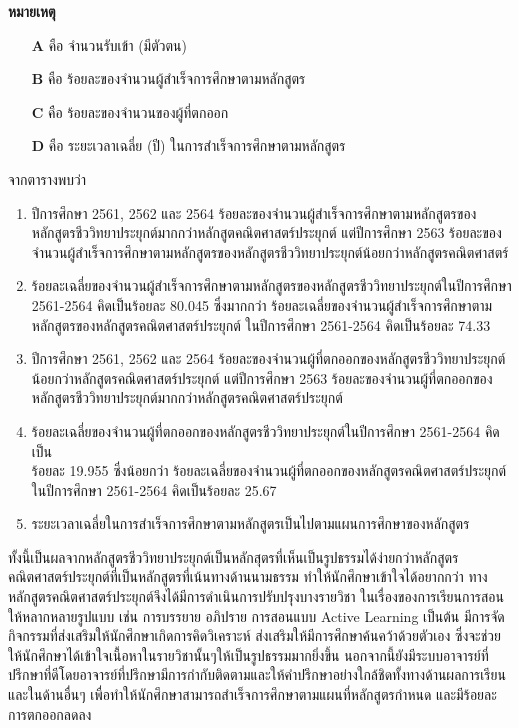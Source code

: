 \textbf{หมายเหตุ} 
\begin{enumerate}
\item [\textbf{A}] คือ จำนวนรับเข้า (มีตัวตน)

\item [\textbf{B}] คือ ร้อยละของจำนวนผู้สำเร็จการศึกษาตามหลักสูตร

\item [\textbf{C}] คือ ร้อยละของจำนวนของผู้ที่ตกออก

\item [\textbf{D}] คือ ระยะเวลาเฉลี่ย (ปี) ในการสำเร็จการศึกษาตามหลักสูตร
\end{enumerate}


 จากตารางพบว่า
 \begin{enumerate}
	\item ปีการศึกษา 2561, 2562 และ 2564 ร้อยละของจำนวนผู้สำเร็จการศึกษาตามหลักสูตรของหลักสูตรชีววิทยาประยุกต์มากกว่าหลักสูตคณิตศาสตร์ประยุกต์ แต่ปีการศึกษา 2563 ร้อยละของจำนวนผู้สำเร็จการศึกษาตามหลักสูตรของหลักสูตรชีววิทยาประยุกต์น้อยกว่าหลักสูตรคณิตศาสตร์ 
	
	\item ร้อยละเฉลี่ยของจำนวนผู้สำเร็จการศึกษาตามหลักสูตรของหลักสูตรชีววิทยาประยุกต์ในปีการศึกษา 2561-2564 คิดเป็นร้อยละ 80.045 ซึ่งมากกว่า  ร้อยละเฉลี่ยของจำนวนผู้สำเร็จการศึกษาตามหลักสูตรของหลักสูตรคณิตศาสตร์ประยุกต์ ในปีการศึกษา 2561-2564 คิดเป็นร้อยละ 74.33
	
	\item ปีการศึกษา 2561, 2562 และ 2564 ร้อยละของจำนวนผู้ที่ตกออกของหลักสูตรชีววิทยาประยุกต์น้อยกว่าหลักสูตรคณิตศาสตร์ประยุกต์  แต่ปีการศึกษา 2563 ร้อยละของจำนวนผู้ที่ตกออกของหลักสูตรชีววิทยาประยุกต์มากกว่าหลักสูตรคณิตศาสตร์ประยุกต์
	
	\item ร้อยละเฉลี่ยของจำนวนผู้ที่ตกออกของหลักสูตรชีววิทยาประยุกต์ในปีการศึกษา 2561-2564 คิดเป็น\\ร้อยละ 19.955 ซึ่งน้อยกว่า ร้อยละเฉลี่ยของจำนวนผู้ที่ตกออกของหลักสูตรคณิตศาสตร์ประยุกต์ ในปีการศึกษา 2561-2564 คิดเป็นร้อยละ 25.67
	
	\item ระยะเวลาเฉลี่ยในการสำเร็จการศึกษาตามหลักสูตรเป็นไปตามแผนการศึกษาของหลักสูตร
\end{enumerate}

ทั้งนี้เป็นผลจากหลักสูตรชีววิทยาประยุกต์เป็นหลักสุตรที่เห็นเป็นรูปธรรมได้ง่ายกว่าหลักสูตรคณิตศาสตร์ประยุกต์ที่เป็นหลักสูตรที่เน้นทางด้านนามธรรม ทำให้นักศึกษาเข้าใจได้อยากกว่า ทางหลักสูตรคณิตศาสตร์ประยุกต์จึงได้มีการดำเนินการปรับปรุงบางรายวิชา ในเรื่องของการเรียนการสอนให้หลากหลายรูปแบบ เช่น การบรรยาย อภิปราย การสอนแบบ Active Learning เป็นต้น มีการจัดกิจกรรมที่ส่งเสริมให้นักศึกษาเกิดการคิดวิเคราะห์ ส่งเสริมให้มีการศึกษาค้นคว้าด้วยตัวเอง ซึ่งจะช่วยให้นักศึกษาได้เข้าใจเนื้อหาในรายวิชานั้นๆให้เป็นรูปธรรมมากยิ่งขึ้น นอกจากนี้ยังมีระบบอาจารย์ที่ปรึกษาที่ดีโดยอาจารย์ที่ปรึกษามีการกำกับติดตามและให้คำปรึกษาอย่างใกล้ชิดทั้งทางด้านผลการเรียนและในด้านอื่นๆ เพื่อทำให้นักศึกษาสามารถสำเร็จการศึกษาตามแผนที่หลักสูตรกำหนด และมีร้อยละการตกออกลดลง 



